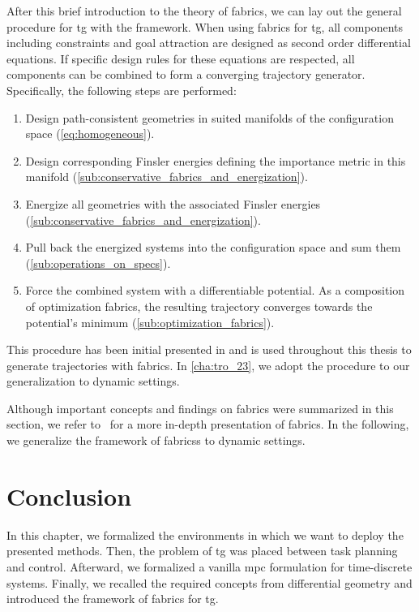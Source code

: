 After this brief introduction to the theory of \ac{fabrics},
we can lay out the general procedure for \ac{tg} with the
framework.
When using \ac{fabrics} for \ac{tg}, all
components including constraints and goal attraction are
designed as second order differential equations. If specific
design rules for these equations are respected, all
components can be combined to form a converging trajectory
generator. Specifically, the following steps are performed:
%
\begin{enumerate}
  \item Design path\hyp{}consistent geometries in suited manifolds of the configuration space
    (\cref{eq:homogeneous}).
  \item Design corresponding Finsler energies defining the importance metric in this manifold
    (\cref{sub:conservative_fabrics_and_energization}).
  \item Energize all geometries with the associated Finsler energies 
    (\cref{sub:conservative_fabrics_and_energization}).
  \item Pull back the energized systems into the configuration space and sum them 
    (\cref{sub:operations_on_specs}).
  \item Force the combined system with a differentiable potential. As a composition of optimization fabrics, 
    the resulting trajectory converges towards the potential's minimum
    (\cref{sub:optimization_fabrics}).
\end{enumerate}

This procedure has been initial presented in
\cite{Ratliff2020} and is used throughout this thesis to
generate trajectories with \ac{fabrics}. In \cref{cha:tro_23},
we adopt the procedure to our generalization to dynamic
settings.

Although important concepts and findings on \ac{fabrics} were summarized in this
section, we refer to~\cite{Ratliff2020} for a more in-depth presentation of
\ac{fabrics}. In the following, we generalize the framework of
\ac{fabricss} to dynamic settings.

\section{Conclusion}%
\label{sec:background_conclusion}

In this chapter, we formalized the environments in which we
want to deploy the presented methods. Then, the problem of
\ac{tg} was placed between task planning and control.
Afterward, we formalized a vanilla \ac{mpc} formulation for
time-discrete systems. Finally, we recalled the required
concepts from differential geometry and introduced the
framework of \ac{fabrics} for \ac{tg}.


